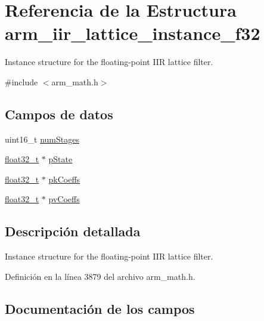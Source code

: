 \hypertarget{structarm__iir__lattice__instance__f32}{}\section{Referencia de la Estructura arm\+\_\+iir\+\_\+lattice\+\_\+instance\+\_\+f32}
\label{structarm__iir__lattice__instance__f32}


Instance structure for the floating-\/point I\+IR lattice filter.  




{\ttfamily \#include $<$arm\+\_\+math.\+h$>$}

\subsection*{Campos de datos}
\begin{DoxyCompactItemize}
\item 
uint16\+\_\+t \hyperlink{structarm__iir__lattice__instance__f32_a4cceb90547b3e585d4c7aabaa8057212}{num\+Stages}
\item 
\hyperlink{arm__math_8h_a4611b605e45ab401f02cab15c5e38715}{float32\+\_\+t} $\ast$ \hyperlink{structarm__iir__lattice__instance__f32_a335c87e6fdc4b96601d95a5de8b9c463}{p\+State}
\item 
\hyperlink{arm__math_8h_a4611b605e45ab401f02cab15c5e38715}{float32\+\_\+t} $\ast$ \hyperlink{structarm__iir__lattice__instance__f32_a994889c5c4a866c50a0ee63326378816}{pk\+Coeffs}
\item 
\hyperlink{arm__math_8h_a4611b605e45ab401f02cab15c5e38715}{float32\+\_\+t} $\ast$ \hyperlink{structarm__iir__lattice__instance__f32_a0f8815744fade9c580d44277ff802308}{pv\+Coeffs}
\end{DoxyCompactItemize}


\subsection{Descripción detallada}
Instance structure for the floating-\/point I\+IR lattice filter. 

Definición en la línea 3879 del archivo arm\+\_\+math.\+h.



\subsection{Documentación de los campos}
